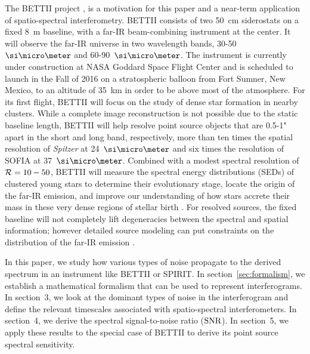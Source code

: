 The BETTII project \citep{Rinehart:2014gk}, is a motivation for this paper and a near-term application of spatio-spectral interferometry. BETTII consists of two 50~cm siderostats on a fixed 8~m baseline, with a far-IR beam-combining instrument at the center. It will observe the far-IR universe in two 
wavelength bands, 30-50~$\um$ and 60-90~$\um$. The instrument is currently under construction at NASA Goddard Space Flight Center and is scheduled to launch in the Fall of 2016 on a stratospheric balloon from Fort Sumner, New Mexico, to an altitude of 35~km in order to be above most of the atmosphere. For its first flight, BETTII will focus on the study of dense star formation in nearby clusters. While a complete image reconstruction is not possible due to the static baseline length, BETTII will help resolve point source objects that are 0.5-1" apart in the short and long band, respectively, more than ten times the spatial resolution of \textit{Spitzer} at 24~$\um$ and six times the resolution of SOFIA at 37~$\um$.  Combined with a modest spectral resolution of $\mathcal{R}=10 - 50$, BETTII will measure the spectral energy distributions (SEDs) of clustered young stars to determine their evolutionary stage, locate the origin of the far-IR emission, and improve our understanding of how stars accrete their mass in these very dense regions of stellar birth \cite[e.g. see][and references therein]{2014prpl.conf..149T}. For resolved sources, the fixed baseline will not completely lift degeneracies between the spectral and spatial information; however detailed source modeling can put constraints on the distribution of the far-IR emission
\citep[e.g][]{Whitney:2013cw}.

In this paper, we study how various types of noise propagate to the derived spectrum in an
instrument like BETTII or SPIRIT. In section~\ref{sec:formalism}, we establish a mathematical formalism that can be used to represent interferograms. In section~3, we look at the dominant types of noise in the interferogram and define the relevant timescales associated with spatio-spectral interferometers. In section~4, we derive the spectral signal-to-noise ratio ($\textrm{SNR}$). In section~5, we apply these results to the special case of BETTII to derive its point source spectral sensitivity.

